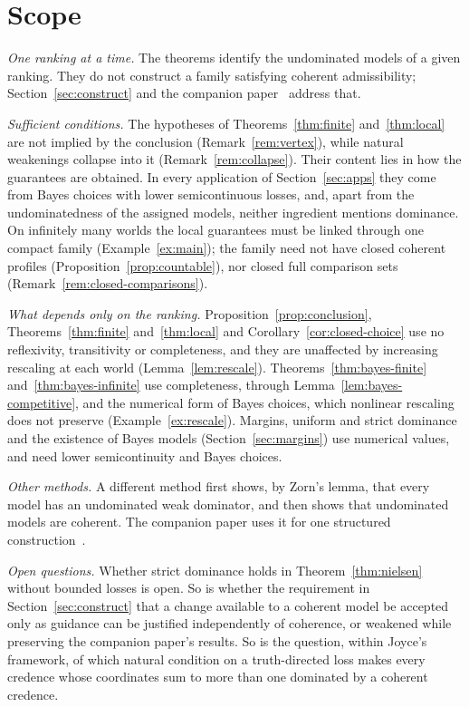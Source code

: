 \documentclass[11pt]{article}
\theoremstyle{definition}
\theoremstyle{remark}
\begin{document}
\section{Scope}\label{sec:scope}
\emph{One ranking at a time.} The theorems identify the undominated models of a given ranking. They do not construct a family satisfying coherent admissibility; Section~\ref{sec:construct} and the companion paper~\cite{KCM} address that.

\emph{Sufficient conditions.} The hypotheses of Theorems~\ref{thm:finite} and~\ref{thm:local} are not implied by the conclusion (Remark~\ref{rem:vertex}), while natural weakenings collapse into it (Remark~\ref{rem:collapse}). Their content lies in how the guarantees are obtained. In every application of Section~\ref{sec:apps} they come from Bayes choices with lower semicontinuous losses, and, apart from the undominatedness of the assigned models, neither ingredient mentions dominance. On infinitely many worlds the local guarantees must be linked through one compact family (Example~\ref{ex:main}); the family need not have closed coherent profiles (Proposition~\ref{prop:countable}), nor closed full comparison sets (Remark~\ref{rem:closed-comparisons}).

\emph{What depends only on the ranking.} Proposition~\ref{prop:conclusion}, Theorems~\ref{thm:finite} and~\ref{thm:local} and Corollary~\ref{cor:closed-choice} use no reflexivity, transitivity or completeness, and they are unaffected by increasing rescaling at each world (Lemma~\ref{lem:rescale}). Theorems~\ref{thm:bayes-finite} and~\ref{thm:bayes-infinite} use completeness, through Lemma~\ref{lem:bayes-competitive}, and the numerical form of Bayes choices, which nonlinear rescaling does not preserve (Example~\ref{ex:rescale}). Margins, uniform and strict dominance and the existence of Bayes models (Section~\ref{sec:margins}) use numerical values, and need lower semicontinuity and Bayes choices.

\emph{Other methods.} A different method first shows, by Zorn's lemma, that every model has an undominated weak dominator, and then shows that undominated models are coherent. The companion paper uses it for one structured construction~\cite{KCM}.

\emph{Open questions.} Whether strict dominance holds in Theorem~\ref{thm:nielsen} without bounded losses is open. So is whether the requirement in Section~\ref{sec:construct} that a change available to a coherent model be accepted only as guidance can be justified independently of coherence, or weakened while preserving the companion paper's results. So is the question, within Joyce's framework, of which natural condition on a truth-directed loss makes every credence whose coordinates sum to more than one dominated by a coherent credence.
\end{document}
